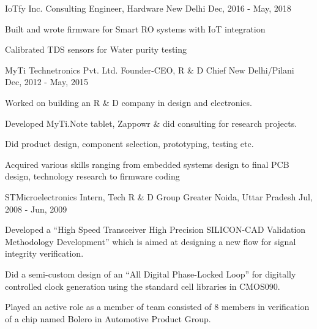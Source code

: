 

\begin{cventries}

\cventry
{IoTfy Inc.} %
{Consulting Engineer, Hardware} %
{New Delhi} %
{Dec, 2016 - May, 2018} %
{
	\begin{cvitems} %
		\item {Built and wrote firmware for Smart RO systems with IoT integration}
		\item {Calibrated TDS sensors for Water purity testing}
	\end{cvitems}
}

  \cventry
    {MyTi Technetronics Pvt. Ltd.} %
    {Founder-CEO, R \& D Chief} %
    {New Delhi/Pilani} %
    {Dec, 2012 - May, 2015} %
    {
      \begin{cvitems} %
        \item {Worked on building an R \& D company in design and electronics.}
        \item {Developed MyTi.Note tablet, Zappowr \& did consulting for research projects.}
        \item {Did product design, component selection, prototyping, testing etc.}
        \item {Acquired various skills ranging from embedded systems design to final PCB design, technology research to firmware coding}
      \end{cvitems}
    }

  \cventry
    {STMicroelectronics} %
    {Intern, Tech R \& D Group} %
    {Greater Noida, Uttar Pradesh} %
    {Jul, 2008 - Jun, 2009} %
    {
      \begin{cvitems} %
        \item {Developed a “High Speed Transceiver High Precision SILICON-CAD Validation Methodology Development” which is aimed at designing a new flow for signal integrity verification.}
        \item {Did a semi-custom design of an “All Digital Phase-Locked Loop” for digitally controlled clock generation using the standard cell libraries in CMOS090.}
        \item {Played an active role as a member of team consisted of 8 members in verification of a chip named Bolero in Automotive Product Group.}
      \end{cvitems}
    }

\end{cventries}
